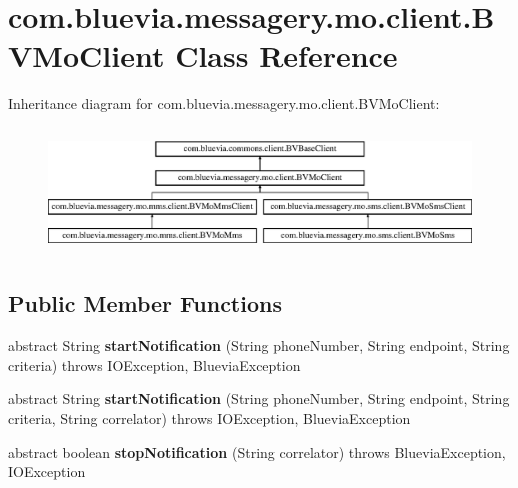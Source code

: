 \hypertarget{classcom_1_1bluevia_1_1messagery_1_1mo_1_1client_1_1BVMoClient}{
\section{com.bluevia.messagery.mo.client.BVMoClient Class Reference}
\label{classcom_1_1bluevia_1_1messagery_1_1mo_1_1client_1_1BVMoClient}
}
Inheritance diagram for com.bluevia.messagery.mo.client.BVMoClient:\begin{figure}[H]
\begin{center}
\leavevmode
\includegraphics[height=3.373494cm]{classcom_1_1bluevia_1_1messagery_1_1mo_1_1client_1_1BVMoClient}
\end{center}
\end{figure}
\subsection*{Public Member Functions}
\begin{DoxyCompactItemize}
\item 
\hypertarget{classcom_1_1bluevia_1_1messagery_1_1mo_1_1client_1_1BVMoClient_a712a1f4d4f298fb7b2951e7e6aa3e412}{
abstract String {\bfseries startNotification} (String phoneNumber, String endpoint, String criteria)  throws IOException, BlueviaException}
\label{classcom_1_1bluevia_1_1messagery_1_1mo_1_1client_1_1BVMoClient_a712a1f4d4f298fb7b2951e7e6aa3e412}

\item 
\hypertarget{classcom_1_1bluevia_1_1messagery_1_1mo_1_1client_1_1BVMoClient_a7d631aa926d99ddad88aa6a00c224c7e}{
abstract String {\bfseries startNotification} (String phoneNumber, String endpoint, String criteria, String correlator)  throws IOException, BlueviaException}
\label{classcom_1_1bluevia_1_1messagery_1_1mo_1_1client_1_1BVMoClient_a7d631aa926d99ddad88aa6a00c224c7e}

\item 
\hypertarget{classcom_1_1bluevia_1_1messagery_1_1mo_1_1client_1_1BVMoClient_a2636897d575bdd0e2b4d4ab8dc261069}{
abstract boolean {\bfseries stopNotification} (String correlator)  throws BlueviaException, IOException}
\label{classcom_1_1bluevia_1_1messagery_1_1mo_1_1client_1_1BVMoClient_a2636897d575bdd0e2b4d4ab8dc261069}

\end{DoxyCompactItemize}
